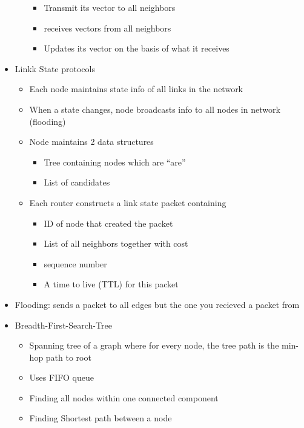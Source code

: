 \documentclass{article}
\begin{document}
\begin{itemize}
\begin{itemize}
            \begin{itemize}
                \item Transmit its vector to all neighbors
                \item receives vectors from all neighbors
                \item Updates its vector on the basis of what it receives
            \end{itemize}
        \end{itemize}
        \item Linkk State protocols
        \begin{itemize}
            \item Each node maintains state info of all links in the network
            \item When a state changes, node broadcasts info to all nodes in network (flooding)
            \item Node maintains 2 data structures
            \begin{itemize}
                \item Tree containing nodes which are ``are''
                \item List of candidates
            \end{itemize}
            \item Each router constructs a link state packet containing
            \begin{itemize}
                \item ID of node that created the packet
                \item List of all neighbors together with cost
                \item sequence number
                \item A time to live (TTL) for this packet
            \end{itemize}
        \end{itemize}
        \item Flooding: sends a packet to all edges but the one you recieved a packet from
        \item Breadth-First-Search-Tree
        \begin{itemize}
            \item Spanning tree of a graph where for every node, the tree path is the min-hop path to root
            \item Uses FIFO queue
            \item Finding all nodes within one connected component
            \item Finding Shortest path between a node

\end{itemize}
\end{itemize}
\end{document}
